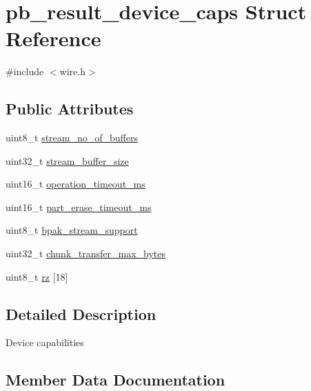 \hypertarget{structpb__result__device__caps}{}\section{pb\+\_\+result\+\_\+device\+\_\+caps Struct Reference}
\label{structpb__result__device__caps}


{\ttfamily \#include $<$wire.\+h$>$}

\subsection*{Public Attributes}
\begin{DoxyCompactItemize}
\item 
uint8\+\_\+t \hyperlink{structpb__result__device__caps_a7b145b0eb656bf957da9ec7adfd91060}{stream\+\_\+no\+\_\+of\+\_\+buffers}
\item 
uint32\+\_\+t \hyperlink{structpb__result__device__caps_a95fc165d071ed1df657e80117e1ab902}{stream\+\_\+buffer\+\_\+size}
\item 
uint16\+\_\+t \hyperlink{structpb__result__device__caps_a8b2405618a75944f28959f0e1df7b747}{operation\+\_\+timeout\+\_\+ms}
\item 
uint16\+\_\+t \hyperlink{structpb__result__device__caps_aad094d645f05d1f8ed740b766d68e6fd}{part\+\_\+erase\+\_\+timeout\+\_\+ms}
\item 
uint8\+\_\+t \hyperlink{structpb__result__device__caps_ab9de81caa8fccde91cd7ff1e4b14091f}{bpak\+\_\+stream\+\_\+support}
\item 
uint32\+\_\+t \hyperlink{structpb__result__device__caps_a10af479a333360bf63b8bc5fccbcc130}{chunk\+\_\+transfer\+\_\+max\+\_\+bytes}
\item 
uint8\+\_\+t \hyperlink{structpb__result__device__caps_aa677655f643620dbe12b5b1f5e99455a}{rz} \mbox{[}18\mbox{]}
\end{DoxyCompactItemize}


\subsection{Detailed Description}
Device capabilities 

\subsection{Member Data Documentation}
\mbox{\label{structpb__result__device__caps_ab9de81caa8fccde91cd7ff1e4b14091f}} 
